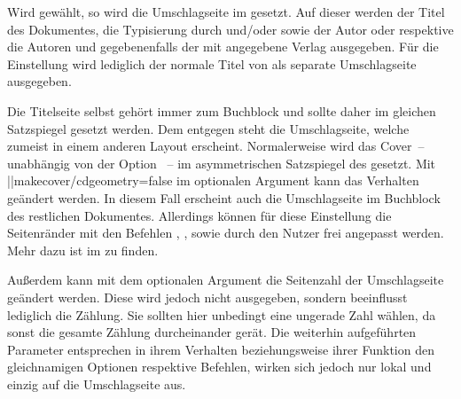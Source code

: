 \begin{DeclareEntity*}{}
\begin{DeclareEntity*}{}
\begin{DeclareEntity*}{}
\begin{Declaration}
\begin{Declaration}
\begin{Declaration}
\begin{Declaration}
\begin{Declaration}
\begin{Declaration}
\begin{Declaration}
\begin{Declaration}
\begin{Declaration}
\begin{Declaration}
\begin{Declaration}
Wird  gewählt, so wird die Umschlagseite im \TUDCD 
gesetzt. Auf dieser werden der Titel des Dokumentes, die Typisierung 
durch  und/oder  sowie der Autor oder respektive 
die Autoren und gegebenenfalls der mit  angegebene Verlag 
ausgegeben.
%
Für die Einstellung  wird lediglich der normale 
Titel von \KOMAScript als separate Umschlagseite ausgegeben. 

Die Titelseite selbst gehört immer zum Buchblock und sollte daher im gleichen 
Satzspiegel gesetzt werden. Dem entgegen steht die Umschlagseite, welche 
zumeist in einem anderen Layout erscheint. Normalerweise wird das Cover~-- 
unabhängig von der Option ~-- im asymmetrischen Satzspiegel 
des \CDs gesetzt. Mit \Macro||{makecover/cdgeometry=false} im optionalen 
Argument kann das Verhalten geändert werden. In diesem Fall erscheint auch die 
Umschlagseite im Buchblock des restlichen Dokumentes. Allerdings können für 
diese Einstellung die Seitenränder mit den Befehlen , 
,  sowie 
 durch den Nutzer frei angepasst werden. Mehr dazu 
ist im \scrguide zu finden.

Außerdem kann mit dem optionalen Argument die Seitenzahl der Umschlagseite 
geändert werden. Diese wird jedoch nicht ausgegeben, sondern beeinflusst 
lediglich die Zählung. Sie sollten hier unbedingt eine ungerade Zahl wählen, da 
sonst die gesamte Zählung durcheinander gerät. Die weiterhin aufgeführten 
Parameter entsprechen in ihrem Verhalten beziehungsweise ihrer Funktion den 
gleichnamigen Optionen respektive Befehlen, wirken sich jedoch nur lokal und 
einzig auf die Umschlagseite aus.%
%
\end{Declaration}
\end{Declaration}
\end{Declaration}
\end{Declaration}
\end{Declaration}
\end{Declaration}
\end{Declaration}
\end{Declaration}
\end{Declaration}
\end{Declaration}
\end{Declaration}


\end{DeclareEntity*}
\end{DeclareEntity*}
\end{DeclareEntity*}
